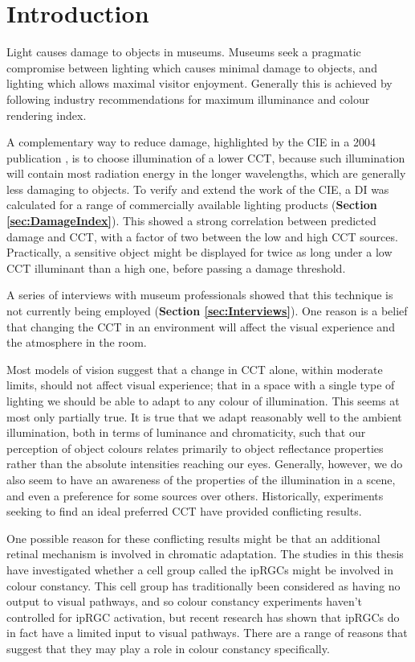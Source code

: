 \chapter{Introduction}
\label{chapterlabel1}

Light causes damage to objects in museums. Museums seek a pragmatic compromise between lighting which causes minimal damage to objects, and lighting which allows maximal visitor enjoyment. Generally this is achieved by following industry recommendations for maximum illuminance and colour rendering index.

A complementary way to reduce damage, highlighted by the \gls{CIE} in a 2004 publication \citep{cie_cie_2004}, is to choose illumination of a lower \gls{CCT}, because such illumination will contain most radiation energy in the longer wavelengths, which are generally less damaging to objects. To verify and extend the work of the \gls{CIE}, a \gls{DI} was calculated for a range of commercially available lighting products (\textbf{Section \ref{sec:DamageIndex}}). This showed a strong correlation between predicted damage and \gls{CCT}, with a factor of two between the low and high \gls{CCT} sources. Practically, a sensitive object might be displayed for twice as long under a low \gls{CCT} illuminant than a high one, before passing a damage threshold. 

A series of interviews with museum professionals showed that this technique is not currently being employed (\textbf{Section \ref{sec:Interviews}}). One reason is a belief that changing the \gls{CCT} in an environment will affect the visual experience and the atmosphere in the room.

Most models of vision suggest that a change in \gls{CCT} alone, within moderate limits, should not affect visual experience; that in a space with a single type of lighting we should be able to adapt to any colour of illumination. This seems at most only partially true. It is true that we adapt reasonably well to the ambient illumination, both in terms of luminance and chromaticity, such that our perception of object colours relates primarily to object reflectance properties rather than the absolute intensities reaching our eyes. Generally, however, we do also seem to have an awareness of the properties of the illumination in a scene, and even a preference for some sources over others. Historically, experiments seeking to find an ideal preferred \gls{CCT} have provided conflicting results.

One possible reason for these conflicting results might be that an additional retinal mechanism is involved in chromatic adaptation. The studies in this thesis have investigated whether a cell group called the \glspl{ipRGC} might be involved in colour constancy. This cell group has traditionally been considered as having no output to visual pathways, and so colour constancy experiments haven't controlled for \gls{ipRGC} activation, but recent research has shown that \glspl{ipRGC} do in fact have a limited input to visual pathways. There are a range of reasons that suggest that they may play a role in colour constancy specifically.

